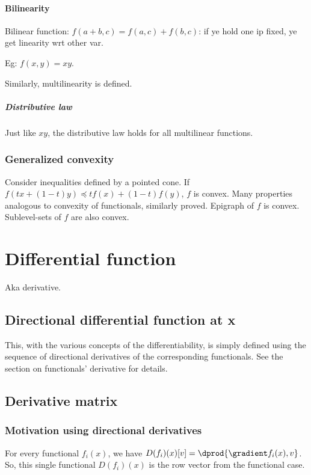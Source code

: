 \documentclass[oneside, article]{memoir}
\begin{document}
\subsubsection{Bilinearity}
Bilinear function: $f(a+b, c) = f(a, c) + f(b, c)$: if ye hold one ip fixed, ye get linearity wrt other var.

Eg: $f(x,y) = xy$.

Similarly, multilinearity is defined.

\paragraph*{Distributive law}
Just like $xy$, the distributive law holds for all multilinear functions. 

\subsection{Generalized convexity}
Consider inequalities defined by a pointed cone. If $f(tx + (1-t)y) \preceq tf(x) + (1-t)f(y)$, $f$ is convex. Many properties analogous to convexity of functionals, similarly proved. Epigraph of $f$ is convex. Sublevel-sets of $f$ are also convex.

\chapter{Differential function}
Aka derivative.

\section{Directional differential function at x}
This, with the various concepts of the differentiability, is simply defined using the sequence of  directional derivatives of the corresponding functionals. See the section on functionals' derivative for details.

\section{Derivative matrix}
\subsection{Motivation using directional derivatives}
For every functional $f_i(x)$, we have $D(f_i)(x)[v] = \dprod{\gradient f_i(x), v}$. So, this single functional $D(f_i)(x)$ is the row vector from the functional case.
\end{document}
